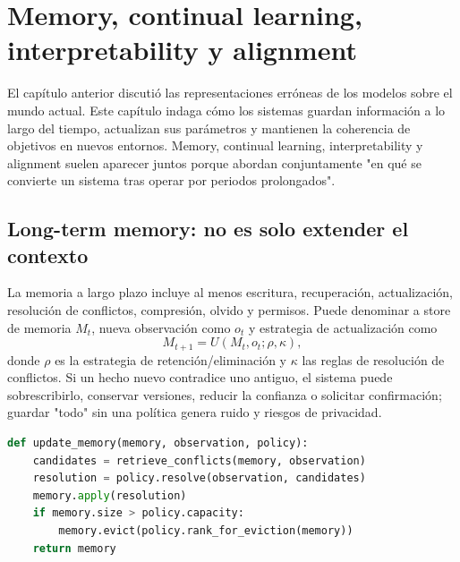 \section{Memory, continual learning, interpretability y alignment}

El capítulo anterior discutió las representaciones erróneas de los modelos sobre el mundo actual. Este capítulo indaga cómo los sistemas guardan información a lo largo del tiempo, actualizan sus parámetros y mantienen la coherencia de objetivos en nuevos entornos. Memory, continual learning, interpretability y alignment suelen aparecer juntos porque abordan conjuntamente "en qué se convierte un sistema tras operar por periodos prolongados".

\subsection{Long-term memory: no es solo extender el contexto}

La memoria a largo plazo incluye al menos escritura, recuperación, actualización, resolución de conflictos, compresión, olvido y permisos. Puede denominar a store de memoria $M_t$, nueva observación como $o_t$ y estrategia de actualización como
\[
M_{t+1}=U(M_t,o_t;\rho,\kappa),
\]
donde $\rho$ es la estrategia de retención/eliminación y $\kappa$ las reglas de resolución de conflictos. Si un hecho nuevo contradice uno antiguo, el sistema puede sobrescribirlo, conservar versiones, reducir la confianza o solicitar confirmación; guardar "todo" sin una política genera ruido y riesgos de privacidad.




\begin{lstlisting}[language=Python,caption={Pseudocódigo de actualización de memoria con estrategia de conflicto y eliminación}]
def update_memory(memory, observation, policy):
    candidates = retrieve_conflicts(memory, observation)
    resolution = policy.resolve(observation, candidates)
    memory.apply(resolution)
    if memory.size > policy.capacity:
        memory.evict(policy.rank_for_eviction(memory))
    return memory
\end{lstlisting}

